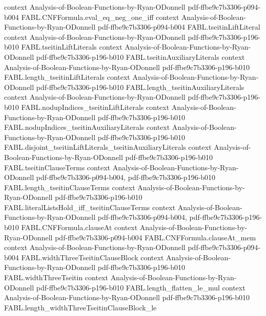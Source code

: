 \begin{theorem}
  {context}
  {Analysis-of-Boolean-Functions-by-Ryan-ODonnell}
  {pdf-ffbe9c7b3306-p094-b004}
\proofstep
  {FABL.CNFFormula.eval_eq_neg_one_iff}
  {context}
  {Analysis-of-Boolean-Functions-by-Ryan-ODonnell}
  {pdf-ffbe9c7b3306-p094-b004}
\proofstep
  {FABL.tseitinLiftLiteral}
  {context}
  {Analysis-of-Boolean-Functions-by-Ryan-ODonnell}
  {pdf-ffbe9c7b3306-p196-b010}
\proofstep
  {FABL.tseitinLiftLiterals}
  {context}
  {Analysis-of-Boolean-Functions-by-Ryan-ODonnell}
  {pdf-ffbe9c7b3306-p196-b010}
\proofstep
  {FABL.tseitinAuxiliaryLiterals}
  {context}
  {Analysis-of-Boolean-Functions-by-Ryan-ODonnell}
  {pdf-ffbe9c7b3306-p196-b010}
\proofstep
  {FABL.length_tseitinLiftLiterals}
  {context}
  {Analysis-of-Boolean-Functions-by-Ryan-ODonnell}
  {pdf-ffbe9c7b3306-p196-b010}
\proofstep
  {FABL.length_tseitinAuxiliaryLiterals}
  {context}
  {Analysis-of-Boolean-Functions-by-Ryan-ODonnell}
  {pdf-ffbe9c7b3306-p196-b010}
\proofstep
  {FABL.nodupIndices_tseitinLiftLiterals}
  {context}
  {Analysis-of-Boolean-Functions-by-Ryan-ODonnell}
  {pdf-ffbe9c7b3306-p196-b010}
\proofstep
  {FABL.nodupIndices_tseitinAuxiliaryLiterals}
  {context}
  {Analysis-of-Boolean-Functions-by-Ryan-ODonnell}
  {pdf-ffbe9c7b3306-p196-b010}
\proofstep
  {FABL.disjoint_tseitinLiftLiterals_tseitinAuxiliaryLiterals}
  {context}
  {Analysis-of-Boolean-Functions-by-Ryan-ODonnell}
  {pdf-ffbe9c7b3306-p196-b010}
\proofstep
  {FABL.tseitinClauseTerms}
  {context}
  {Analysis-of-Boolean-Functions-by-Ryan-ODonnell}
  {pdf-ffbe9c7b3306-p094-b004,
    pdf-ffbe9c7b3306-p196-b010}
\proofstep
  {FABL.length_tseitinClauseTerms}
  {context}
  {Analysis-of-Boolean-Functions-by-Ryan-ODonnell}
  {pdf-ffbe9c7b3306-p196-b010}
\proofstep
  {FABL.literalListsHold_iff_tseitinClauseTerms}
  {context}
  {Analysis-of-Boolean-Functions-by-Ryan-ODonnell}
  {pdf-ffbe9c7b3306-p094-b004,
    pdf-ffbe9c7b3306-p196-b010}
\proofstep
  {FABL.CNFFormula.clauseAt}
  {context}
  {Analysis-of-Boolean-Functions-by-Ryan-ODonnell}
  {pdf-ffbe9c7b3306-p094-b004}
\proofstep
  {FABL.CNFFormula.clauseAt_mem}
  {context}
  {Analysis-of-Boolean-Functions-by-Ryan-ODonnell}
  {pdf-ffbe9c7b3306-p094-b004}
\proofstep
  {FABL.widthThreeTseitinClauseBlock}
  {context}
  {Analysis-of-Boolean-Functions-by-Ryan-ODonnell}
  {pdf-ffbe9c7b3306-p196-b010}
\proofstep
  {FABL.widthThreeTseitin}
  {context}
  {Analysis-of-Boolean-Functions-by-Ryan-ODonnell}
  {pdf-ffbe9c7b3306-p196-b010}
\proofstep
  {FABL.length_flatten_le_mul}
  {context}
  {Analysis-of-Boolean-Functions-by-Ryan-ODonnell}
  {pdf-ffbe9c7b3306-p196-b010}
\proofstep
  {FABL.length_widthThreeTseitinClauseBlock_le}

\end{theorem}
